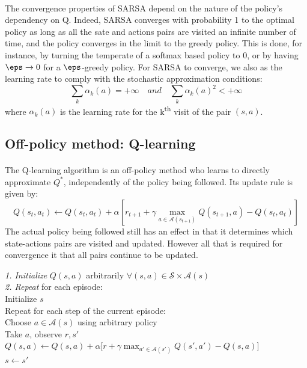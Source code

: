 \documentclass[a4paper]{report}
\begin{document}
{{{					\paragraph{} The convergence properties of SARSA depend on the nature of the policy's dependency on Q. Indeed, SARSA converges with probability 1 to the optimal policy as long as all the sate and actions pairs are visited an infinite number of time, and the policy converges in the limit to the greedy policy. This is done, for instance, by turning the temperate of a softmax based policy to 0, or by having $\eps\to 0$ for a $\eps$-greedy policy. For SARSA to converge, we also as the learning rate to comply with the stochastic approximation conditions: 
					\begin{equation}
						\sum_k \alpha_k(a) = +\infty \quad { and } \quad \sum_k \alpha_k(a)^2 < +\infty
					\end{equation}
					where $\alpha_k(a)$ is the learning rate for the k\textsuperscript{th} visit of the pair $(s,a)$. 
					
			}
			\subsection{Off-policy method: Q-learning}
			{
				\paragraph{} The Q-learning algorithm is an off-policy method who learns to directly approximate $Q^*$, independently of the policy being followed. Its update rule is given by:
				\begin{equation}
					Q(s_t,a_t) \leftarrow Q(s_t,a_t) + \alpha \left[ r_{t+1} + \gamma \max_{a\in\mathcal{A}(s_{t+1})} Q(s_{t+1},a) - Q(s_t,a_t)\right]
				\end{equation}
				The actual policy being followed still has an effect in that it determines which state-actions pairs are visited and updated. However all that is required for convergence it that all pairs continue to be updated. 
				\vspace{10pt}
				
					{
						\begin{algorithm}[H]
	 					\SetAlgoLined
						\LinesNumbered
						\emph{\textsf{1. Initialize}} $Q(s,a)$ arbitrarily $\forall (s,a)\in\mathcal{S}\times\mathcal{A}(s)$ \\
						\BlankLine
						\BlankLine
						\emph{\textsf{2. Repeat}} for each episode: \\
						\Indp \Indp 
							Initialize $s$ \\
							Repeat for each step of the current episode:   \\
							\Indp \Indp 
								Choose $a\in\mathcal{A}(s)$ using arbitrary policy \\
								Take $a$, observe $r,s'$ \\
								$ Q(s,a) \longleftarrow Q(s,a) + \alpha\big[ r + \gamma \max_{a'\in\mathcal{A}(s')}Q(s',a') - Q(s,a) \big]$ \\
								$s\leftarrow s' $ \\
								

\end{algorithm}}}}}
\end{document}
